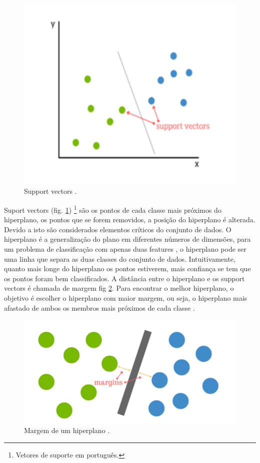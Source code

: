 \begin{figure}[H]
\centering
\includegraphics[scale=0.4]{figs/svm1}
\caption{Support vectors \cite{svm_tres}.}\label{svm1}
\end{figure}

Suport vectors (fig. \ref{svm1}) \footnote{Vetores de suporte em português.} são os pontos de cada classe mais próximos do hiperplano, os pontos que se forem removidos, a posição do hiperplano é alterada. Devido a isto são considerados elementos críticos do conjunto de dados.
O hiperplano é a generalização do plano em diferentes números de dimensões, para um problema de classificação com apenas duas features
, o hiperplano pode ser uma linha que separa as duas classes do conjunto de dados. Intuitivamente, quanto mais longe do hiperplano os pontos estiverem, mais confiança se tem que os pontos foram bem classificados.
A distância entre o hiperplano e os support vectors é chamada de margem fig \ref{svm2}. Para encontrar o melhor hiperplano, o objetivo é escolher o hiperplano com maior margem, ou seja, o hiperplano mais afastado de ambos os membros mais próximos de cada classe \cite{svm_um}.


\begin{figure}[H]
\centering
\includegraphics[scale=0.3]{figs/svm2}
\caption{Margem de um hiperplano \cite{svm_tres}.}\label{svm2}
\end{figure}

